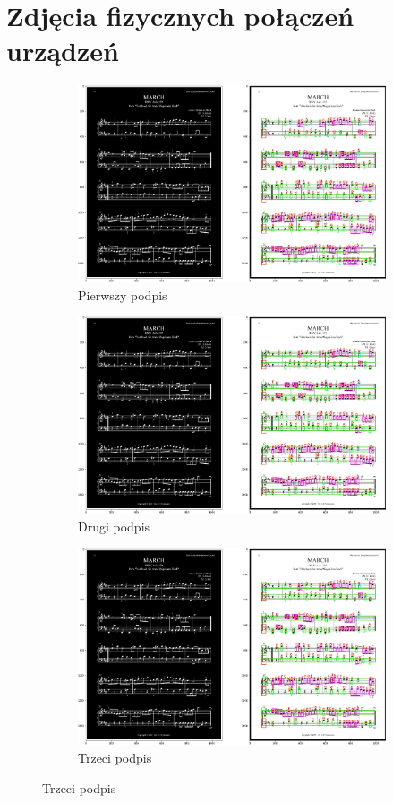 \documentclass[12pt]{article}
\begin{document}
\section{Zdjęcia fizycznych połączeń urządzeń}
\begin{figure}[h!]
	\centering
	\begin{subfigure}[b]{0.32\linewidth}
		\includegraphics[width=\linewidth]{zdjs/Zdj0.png}
		\caption{Pierwszy podpis}
	\end{subfigure}
	\begin{subfigure}[b]{0.32\linewidth}
		\includegraphics[width=\linewidth]{zdjs/Zdj0.png}
		\caption{Drugi podpis}
	\end{subfigure}
	\begin{subfigure}[b]{0.32\linewidth}
		\includegraphics[width=\linewidth]{zdjs/Zdj0.png}
		\caption{Trzeci podpis}
	\end{subfigure}
	

\end{figure}
\end{document}
